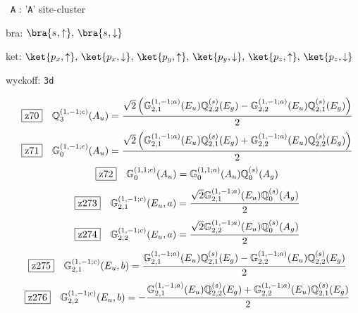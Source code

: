 \documentclass[fleqn,10pt,landscape]{jsarticle}
\begin{document}
\noindent\textbullet\, \texttt{A} : '\texttt{A}' site-cluster

\noindent\quad * bra: $\bra{s_{},\uparrow},\, \bra{s_{},\downarrow}$

\noindent\quad * ket: $\ket{p_{x},\uparrow},\, \ket{p_{x},\downarrow},\, \ket{p_{y},\uparrow},\, \ket{p_{y},\downarrow},\, \ket{p_{z},\uparrow},\, \ket{p_{z},\downarrow}$

\noindent\quad * wyckoff: \texttt{3d}

\begin{dmath*}
\hspace*{3mm}\fbox{z70}\quad \mathbb{Q}_{3}^{(1,-1;c)}(A_{u})=\frac{\sqrt{2} \left(\mathbb{G}_{2,1}^{(1,-1;a)}(E_{u}) \mathbb{Q}_{2,2}^{(s)}(E_{g}) - \mathbb{G}_{2,2}^{(1,-1;a)}(E_{u}) \mathbb{Q}_{2,1}^{(s)}(E_{g})\right)}{2}
\end{dmath*}
\begin{dmath*}
\hspace*{3mm}\fbox{z71}\quad \mathbb{G}_{0}^{(1,-1;c)}(A_{u})=\frac{\sqrt{2} \left(\mathbb{G}_{2,1}^{(1,-1;a)}(E_{u}) \mathbb{Q}_{2,1}^{(s)}(E_{g}) + \mathbb{G}_{2,2}^{(1,-1;a)}(E_{u}) \mathbb{Q}_{2,2}^{(s)}(E_{g})\right)}{2}
\end{dmath*}
\begin{dmath*}
\hspace*{3mm}\fbox{z72}\quad \mathbb{G}_{0}^{(1,1;c)}(A_{u})=\mathbb{G}_{0}^{(1,1;a)}(A_{u}) \mathbb{Q}_{0}^{(s)}(A_{g})
\end{dmath*}
\begin{dmath*}
\hspace*{3mm}\fbox{z273}\quad \mathbb{G}_{2,1}^{(1,-1;c)}(E_{u},a)=\frac{\sqrt{2} \mathbb{G}_{2,1}^{(1,-1;a)}(E_{u}) \mathbb{Q}_{0}^{(s)}(A_{g})}{2}
\end{dmath*}
\begin{dmath*}
\hspace*{3mm}\fbox{z274}\quad \mathbb{G}_{2,2}^{(1,-1;c)}(E_{u},a)=\frac{\sqrt{2} \mathbb{G}_{2,2}^{(1,-1;a)}(E_{u}) \mathbb{Q}_{0}^{(s)}(A_{g})}{2}
\end{dmath*}
\begin{dmath*}
\hspace*{3mm}\fbox{z275}\quad \mathbb{G}_{2,1}^{(1,-1;c)}(E_{u},b)=\frac{\mathbb{G}_{2,1}^{(1,-1;a)}(E_{u}) \mathbb{Q}_{2,1}^{(s)}(E_{g}) - \mathbb{G}_{2,2}^{(1,-1;a)}(E_{u}) \mathbb{Q}_{2,2}^{(s)}(E_{g})}{2}
\end{dmath*}
\begin{dmath*}
\hspace*{3mm}\fbox{z276}\quad \mathbb{G}_{2,2}^{(1,-1;c)}(E_{u},b)=- \frac{\mathbb{G}_{2,1}^{(1,-1;a)}(E_{u}) \mathbb{Q}_{2,2}^{(s)}(E_{g}) + \mathbb{G}_{2,2}^{(1,-1;a)}(E_{u}) \mathbb{Q}_{2,1}^{(s)}(E_{g})}{2}
\end{dmath*}
\end{document}
